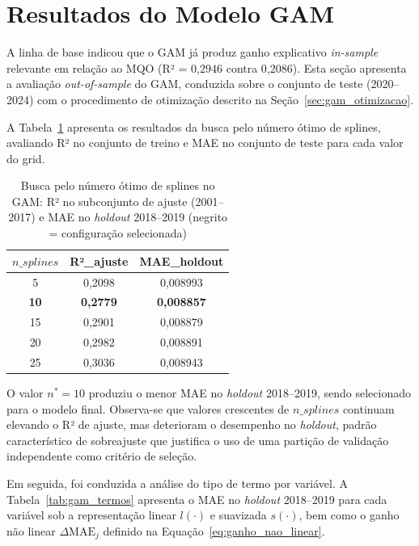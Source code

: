 \documentclass[	12pt, Times, openright, oneside, a4paper, english, brazil]{abntex2}
\begin{document}
\section{Resultados do Modelo GAM}\label{sec:resultados_gam}

A linha de base indicou que o GAM já produz ganho explicativo \textit{in-sample} relevante em relação ao MQO (R² = 0{,}2946 contra 0{,}2086). Esta seção apresenta a avaliação \textit{out-of-sample} do GAM, conduzida sobre o conjunto de teste (2020--2024) com o procedimento de otimização descrito na Seção~\ref{sec:gam_otimizacao}.

A Tabela~\ref{tab:gam_nsplines} apresenta os resultados da busca pelo número ótimo de splines, avaliando R² no conjunto de treino e MAE no conjunto de teste para cada valor do grid.

\begin{table}[ht!]
\centering
\begin{tabular}{|c|c|c|}
\hline
\textbf{$n\_splines$} & \textbf{R²\_ajuste} & \textbf{MAE\_holdout} \\ \hline
5  & 0{,}2098 & 0{,}008993 \\ \hline
\textbf{10} & \textbf{0{,}2779} & \textbf{0{,}008857} \\ \hline
15 & 0{,}2901 & 0{,}008879 \\ \hline
20 & 0{,}2982 & 0{,}008891 \\ \hline
25 & 0{,}3036 & 0{,}008943 \\ \hline
\end{tabular}
\caption{Busca pelo número ótimo de splines no GAM: R² no subconjunto de ajuste (2001--2017) e MAE no \textit{holdout} 2018--2019 (negrito = configuração selecionada)}\label{tab:gam_nsplines}
\end{table}

O valor $n^* = 10$ produziu o menor MAE no \textit{holdout} 2018--2019, sendo selecionado para o modelo final. Observa-se que valores crescentes de $n\_splines$ continuam elevando o R² de ajuste, mas deterioram o desempenho no \textit{holdout}, padrão característico de sobreajuste que justifica o uso de uma partição de validação independente como critério de seleção.

Em seguida, foi conduzida a análise do tipo de termo por variável. A Tabela~\ref{tab:gam_termos} apresenta o MAE no \textit{holdout} 2018--2019 para cada variável sob a representação linear $l(\cdot)$ e suavizada $s(\cdot)$, bem como o ganho não linear $\Delta\text{MAE}_j$ definido na Equação~\ref{eq:ganho_nao_linear}.
\end{document}

